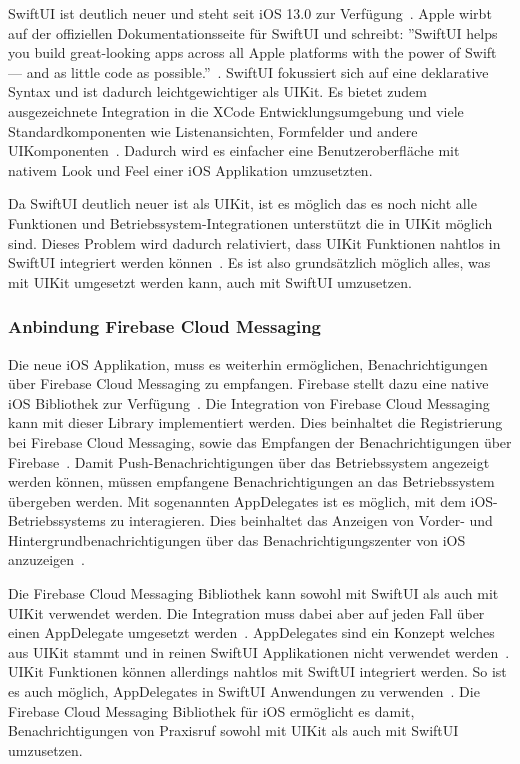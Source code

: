 SwiftUI ist deutlich neuer und steht seit iOS 13.0 zur Verfügung~\cite{ios_swift_ui}.
Apple wirbt auf der offiziellen Dokumentationsseite für SwiftUI und schreibt: ''SwiftUI helps you build great-looking apps across all Apple platforms with the power of Swift — and as little code as possible.''~\cite{ios_swift_ui}.
SwiftUI fokussiert sich auf eine deklarative Syntax und ist dadurch leichtgewichtiger als UIKit.
Es bietet zudem ausgezeichnete Integration in die XCode Entwicklungsumgebung und viele Standardkomponenten wie Listenansichten, Formfelder und andere UIKomponenten~\cite{ios_swift_ui}.
Dadurch wird es einfacher eine Benutzeroberfläche mit nativem Look und Feel einer iOS Applikation umzusetzten.

Da SwiftUI deutlich neuer ist als UIKit, ist es möglich das es noch nicht alle Funktionen und Betriebssystem-Integrationen unterstützt die in UIKit möglich sind.
Dieses Problem wird dadurch relativiert, dass UIKit Funktionen nahtlos in SwiftUI integriert werden können~\cite{ios_swift_ui_uikit}.
Es ist also grundsätzlich möglich alles, was mit UIKit umgesetzt werden kann, auch mit SwiftUI umzusetzen.

\clearpage

\subsubsection{Anbindung Firebase Cloud Messaging}

Die neue iOS Applikation, muss es weiterhin ermöglichen, Benachrichtigungen über Firebase Cloud Messaging zu empfangen.
Firebase stellt dazu eine native iOS Bibliothek zur Verfügung~\cite{firebase_github_ios}.
Die Integration von Firebase Cloud Messaging kann mit dieser Library implementiert werden.
Dies beinhaltet die Registrierung bei Firebase Cloud Messaging, sowie das Empfangen der Benachrichtigungen über Firebase~\cite{firebase_ios}.
Damit Push-Benachrichtigungen über das Betriebssystem angezeigt werden können, müssen empfangene Benachrichtigungen an das Betriebssystem übergeben werden.
Mit sogenannten AppDelegates ist es möglich, mit dem iOS-Betriebssystems zu interagieren.
Dies beinhaltet das Anzeigen von Vorder- und Hintergrundbenachrichtigungen über das Benachrichtigungszenter von iOS anzuzeigen~\cite{ios_app_delegate}.

Die Firebase Cloud Messaging Bibliothek kann sowohl mit SwiftUI als auch mit UIKit verwendet werden.
Die Integration muss dabei aber auf jeden Fall über einen AppDelegate umgesetzt werden~\cite{firebase_ios}.
AppDelegates sind ein Konzept welches aus UIKit stammt und in reinen SwiftUI Applikationen nicht verwendet werden~\cite{ios_app_delegate}.
UIKit Funktionen können allerdings nahtlos mit SwiftUI integriert werden.
So ist es auch möglich, AppDelegates in SwiftUI Anwendungen zu verwenden~\cite{ios_swift_ui_uikit}.
Die Firebase Cloud Messaging Bibliothek für iOS ermöglicht es damit, Benachrichtigungen von Praxisruf sowohl mit UIKit als auch mit SwiftUI umzusetzen.

